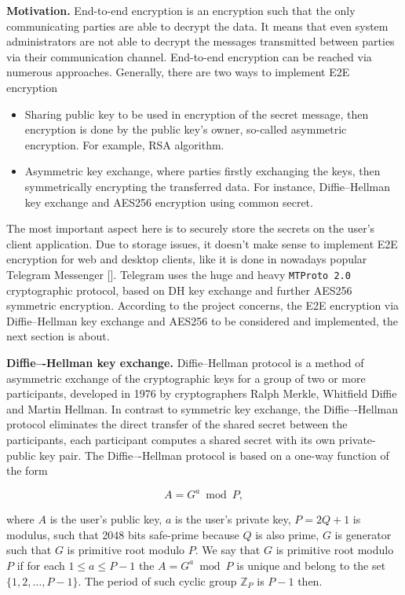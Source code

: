 \textbf{Motivation.} End-to-end encryption is an encryption such that the only communicating parties
are able to decrypt the data.
It means that even system administrators are not able to decrypt the messages transmitted between parties
via their communication channel.
End-to-end encryption can be reached via numerous approaches.
Generally, there are two ways to implement E2E encryption
\begin{itemize}
    \item Sharing public key to be used in encryption of the secret message, then encryption is done by the
    public key's owner, so-called asymmetric encryption.
    For example, RSA algorithm.
    \item Asymmetric key exchange, where parties firstly exchanging the keys, then symmetrically encrypting
    the transferred data.
    For instance, Diffie--Hellman key exchange and AES256 encryption using common secret.
\end{itemize}
The most important aspect here is to securely store the secrets on the user's client application.
Due to storage issues, it doesn't make sense to implement E2E encryption for web
and desktop clients, like it is done in nowadays popular Telegram Messenger
[\cite{job2015modified,suvsanka2017security,lee2017security}].
Telegram uses the huge and heavy \texttt{MTProto 2.0} cryptographic protocol, based on DH key exchange and further AES256
symmetric encryption.
According to the project concerns, the E2E encryption via Diffie--Hellman key exchange and AES256
to be considered and implemented, the next section is about.

\textbf{Diffie–-Hellman key exchange.} Diffie--Hellman protocol is a method of asymmetric exchange
of the cryptographic keys for a group of two or more participants,
developed in 1976 by cryptographers Ralph Merkle, Whitfield Diffie and Martin Hellman.
In contrast to symmetric key exchange, the Diffie–-Hellman protocol eliminates the direct transfer of the shared secret
between the participants, each participant computes a shared secret with its own private-public key pair.
The Diffie–-Hellman protocol is based on a one-way function of the form

\[
    A = G ^ a \bmod P,
\]

where $A$ is the user's public key,
$a$ is the user's private key,
$P=2Q+1$ is modulus, such that 2048 bits safe-prime because $Q$ is also prime,
$G$ is generator such that $G$ is primitive root modulo $P$.
We say that $G$ is primitive root modulo $P$ if for each $1 \leq a \leq P - 1$ the $A = G ^ a \bmod P$
is unique and belong to the set $\{1, 2, \dots, P-1\}$.
The period of such cyclic group $\mathbb{Z}_{P}$ is $P-1$ then.

